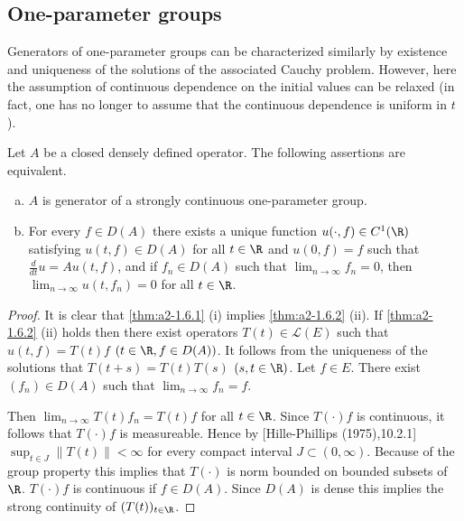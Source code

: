 \subsection{One-parameter groups} \label{subsec:a2-1.se2}
Generators of one-parameter groups can be characterized similarly by existence and uniqueness of the solutions of the associated Cauchy problem.
However, here the assumption of continuous dependence on the initial values can be relaxed (in fact, one has no longer to assume that the continuous dependence is uniform in $t$).
\begin{theorem}\label{thm:a2-1.6}
Let $A$ be a closed densely defined operator.
The following assertions are equivalent.
\begin{enumerate}[(a)]
\item \label{thm:a2-1.6.1}
$A$ is generator of a strongly continuous one-parameter group.
\item  \label{thm:a2-1.6.2}
For every $f \in D(A)$ there exists a unique function $u(\cdot,f) \in C^{1}(\R)$ satisfying $u(t,f) \in D(A)$ for all $t \in \R$ and $u(0,f) = f$ such that $\frac{d}{dt}u = Au(t,f)$, and if $f_{n} \in D(A)$ such that $\lim_{n \to \infty} f_{n} = 0$, then $\lim_{n \to \infty} u(t,f_{n}) = 0$ for all $t \in \R$.
\end{enumerate}
\end{theorem}
\begin{proof}
It is clear that \ref{thm:a2-1.6.1} (\lnm i) implies \ref{thm:a2-1.6.2} (\lnm ii).
If \ref{thm:a2-1.6.2} (\lnm ii) holds then there exist operators $T(t) \in \mathcal{L}(E)$ such that $u(t,f) = T(t)f$ $(t \in \R, f \in D(A))$.
It follows from the uniqueness of the solutions that $T(t+s) = T(t)T(s)$ $(s,t \in \R)$.
Let $f \in E$. 
There exist $(f_{n}) \in D(A)$ such that $\lim_{n \to \infty} f_{n} = f$.

Then $\lim_{n \to \infty} T(t)f_{n} = T(t)f$ for all $t \in \R$.
Since $T(\cdot)f$ is continuous, it follows that $T(\cdot)f$ is measureable.
Hence by [Hille-Phillips (1975),10.2.1] $\sup_{t \in J}\|T(t)\| < \infty$ for every compact interval $J \subset (0,\infty)$.
Because of the group property this implies that $T(\cdot)$ is norm bounded on bounded subsets of $\R$.
$T(\cdot)f$ is continuous if $f \in D(A)$.
Since $D(A)$ is dense this implies the strong continuity of $(T(t))_{t \in \R}$.
\end{proof}
